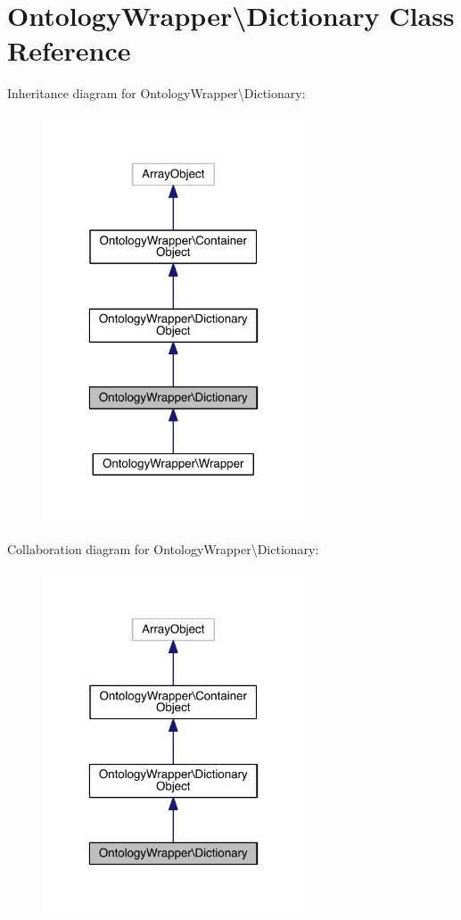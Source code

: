 \hypertarget{class_ontology_wrapper_1_1_dictionary}{\section{Ontology\-Wrapper\textbackslash{}Dictionary Class Reference}
\label{class_ontology_wrapper_1_1_dictionary}
}


Inheritance diagram for Ontology\-Wrapper\textbackslash{}Dictionary\-:
\nopagebreak
\begin{figure}[H]
\begin{center}
\leavevmode
\includegraphics[width=220pt]{class_ontology_wrapper_1_1_dictionary__inherit__graph}
\end{center}
\end{figure}


Collaboration diagram for Ontology\-Wrapper\textbackslash{}Dictionary\-:
\nopagebreak
\begin{figure}[H]
\begin{center}
\leavevmode
\includegraphics[width=220pt]{class_ontology_wrapper_1_1_dictionary__coll__graph}
\end{center}
\end{figure}
